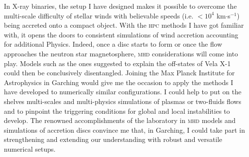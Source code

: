 \documentclass[a4paper,12pt,onecolumn]{article}
\begin{document}
\indent In X-ray binaries, the setup I have designed makes it possible to overcome the multi-scale difficulty of stellar winds with believable speeds (i.e. $<10^4$ km$\cdot$s$^{-1}$) being accreted onto a compact object. With the \textsc{hpc} methods I have got familiar with, it opens the doors to consistent simulations of wind accretion accounting for additional Physics. Indeed, once a disc starts to form or once the flow approaches the neutron star magnetosphere, \textsc{mhd} considerations will come into play. Models such as the ones suggested to explain the off-states of Vela X-1 could then be conclusively disentangled. Joining the Max Planck Institute for Astrophysics in Garching would give me the occasion to apply the methods I have developed to numerically similar configurations. I could help to put on the shelves multi-scales and multi-physics simulations of plasmas or two-fluids flows and to pinpoint the triggering conditions for global and local instabilities to develop. The renowned accomplishments of the laboratory in \textsc{mhd} models and simulations of accretion discs convince me that, in Garching, I could take part in strengthening and extending our understanding with robust and versatile numerical setups.

\newpage

\setlength{\bibsep}{5pt}
\small


\end{document}
